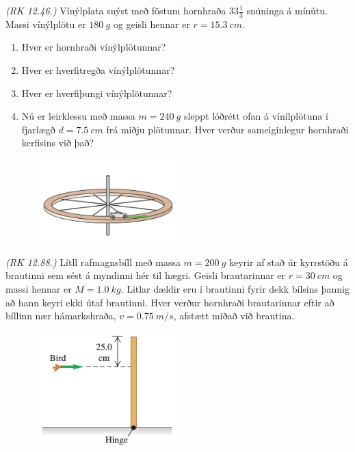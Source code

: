 \begin{enumerate}[label = \textbf{Dæmi \thechapter.\arabic*.}]
\item \textit{(RK 12.46.)} Vínýlplata snýst með föstum hornhraða $33 \frac{1}{3}$ snúninga á mínútu. Massi vínýlplötu er $\SI{180}{g}$ og geisli hennar er $r = \SI{15.3}{cm}$.
\begin{enumerate}[label = \textbf{(\alph*)}]
    \item Hver er hornhraði vínýlplötunnar?
    \item Hver er hverfitregða vínýlplötunnar?
    \item Hver er hverfiþungi vínýlplötunnar?
    \item Nú er leirklessu með massa $m = \SI{240}{g}$ sleppt lóðrétt ofan á vínílplötuna í fjarlægð $d = \SI{7.5}{cm}$ frá miðju plötunnar. Hver verður sameiginlegur hornhraði kerfisins við það?
\end{enumerate}

\begin{minipage}{\linewidth}

\begin{figure}
\vspace{-1.25cm}
\includegraphics[width=2.2in]{images/bilahverfi.png}
\end{figure}

\item \textit{(RK 12.88.)} Lítll rafmagnsbíll með massa $m = \SI{200}{g}$ keyrir af stað úr kyrrstöðu á brautinni sem sést á myndinni hér til hægri. Geisli brautarinnar er $r = \SI{30}{cm}$ og massi hennar er $M = \SI{1.0}{kg}$. Litlar dældir eru í brautinni fyrir dekk bílsins þannig að hann keyri ekki útaf brautinni. Hver verður hornhraði brautarinnar eftir að bíllinn nær hámarkshraða, $v = \SI{0.75}{m/s}$, afstætt miðað við brautina.

\end{minipage}

\vspace{0.5cm}

\begin{minipage}{\linewidth}
\begin{figure}
\vspace{-1.25cm}
\includegraphics[width=2.2in]{images/fugl.png}
\end{figure}


\end{minipage}
\end{enumerate}
